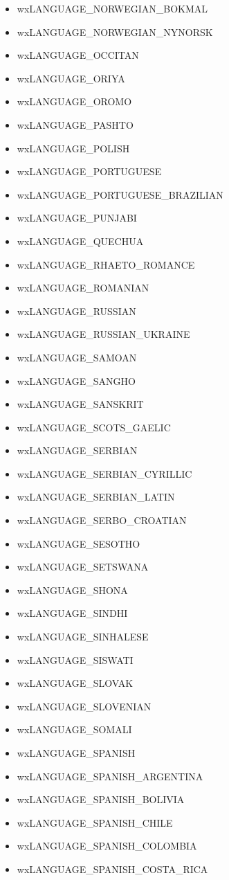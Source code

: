 \begin{itemize}
\item wxLANGUAGE\_NORWEGIAN\_BOKMAL
\item wxLANGUAGE\_NORWEGIAN\_NYNORSK
\item wxLANGUAGE\_OCCITAN
\item wxLANGUAGE\_ORIYA
\item wxLANGUAGE\_OROMO
\item wxLANGUAGE\_PASHTO
\item wxLANGUAGE\_POLISH
\item wxLANGUAGE\_PORTUGUESE
\item wxLANGUAGE\_PORTUGUESE\_BRAZILIAN
\item wxLANGUAGE\_PUNJABI
\item wxLANGUAGE\_QUECHUA
\item wxLANGUAGE\_RHAETO\_ROMANCE
\item wxLANGUAGE\_ROMANIAN
\item wxLANGUAGE\_RUSSIAN
\item wxLANGUAGE\_RUSSIAN\_UKRAINE
\item wxLANGUAGE\_SAMOAN
\item wxLANGUAGE\_SANGHO
\item wxLANGUAGE\_SANSKRIT
\item wxLANGUAGE\_SCOTS\_GAELIC
\item wxLANGUAGE\_SERBIAN
\item wxLANGUAGE\_SERBIAN\_CYRILLIC
\item wxLANGUAGE\_SERBIAN\_LATIN
\item wxLANGUAGE\_SERBO\_CROATIAN
\item wxLANGUAGE\_SESOTHO
\item wxLANGUAGE\_SETSWANA
\item wxLANGUAGE\_SHONA
\item wxLANGUAGE\_SINDHI
\item wxLANGUAGE\_SINHALESE
\item wxLANGUAGE\_SISWATI
\item wxLANGUAGE\_SLOVAK
\item wxLANGUAGE\_SLOVENIAN
\item wxLANGUAGE\_SOMALI
\item wxLANGUAGE\_SPANISH
\item wxLANGUAGE\_SPANISH\_ARGENTINA
\item wxLANGUAGE\_SPANISH\_BOLIVIA
\item wxLANGUAGE\_SPANISH\_CHILE
\item wxLANGUAGE\_SPANISH\_COLOMBIA
\item wxLANGUAGE\_SPANISH\_COSTA\_RICA

\end{itemize}

